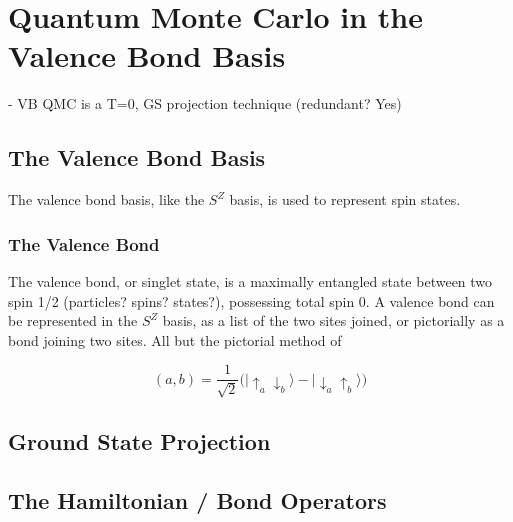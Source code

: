 \chapter{Quantum Monte Carlo in the Valence Bond Basis}

- VB QMC is a T=0, GS projection technique (redundant? Yes)\\
\section{The Valence Bond Basis}

The valence bond basis, like the $S^Z$ basis, is used to represent spin states.

\subsection{The Valence Bond}
The valence bond, or singlet state, is a maximally entangled state between two spin 1/2 (particles? spins? states?),
possessing total spin 0.  A valence bond can be represented in the $S^Z$ basis, as a list of the two sites joined, or 
pictorially as a bond joining two sites.  All but the pictorial method of 

\begin{equation}
   (a,b) = \frac{1}{\sqrt{2}}\big( \lvert \uparrow_a \downarrow_b \rangle - \lvert \downarrow_a \uparrow_b \rangle \big)
   \label{eqn_vb}
\end{equation}

\section{Ground State Projection}
\section{The Hamiltonian / Bond Operators}
